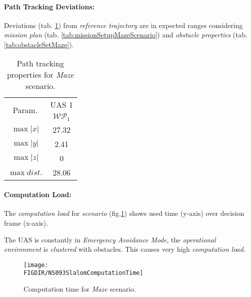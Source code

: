 \paragraph{Path Tracking Deviations:} Deviations (tab. \ref{tab:pathTrackingParametersForMazeAvoidance}) from \emph{reference trajectory} are in expected ranges considering \emph{mission plan} (tab. \ref{tab:missionSetupMazeScenario}) and \emph{obstacle properties} (tab. \ref{tab:obstacleSetMaze}).

\begin{table}[H]
    \centering
    \begin{tabular}{c||c}
        \multirow{2}{*}{Param.} & UAS 1\\\cline{2-2}
                        & $\mathscr{WP}_1$  \\\hline\hline
          $\max |x|$    & 27.32             \\\hline
          $\max |y|$    & 2.41             \\\hline
          $\max |z|$    & 0                 \\\hline
          $\max dist.$  & 28.06             \\
    \end{tabular}
    \caption{Path tracking properties for \emph{Maze} scenario.}
    \label{tab:pathTrackingParametersForMazeAvoidance}
\end{table}


\paragraph{Computation Load:} The \emph{computation load} for \emph{scenario} (fig.\ref{fig:mazeComputationTime}) shows used time (y-axis) over decision frame (x-axis).

The UAS is constantly in \emph{Emergency Avoidance Mode}, the \emph{operational environment} is \emph{clustered} with obstacles. This causes very high \emph{computation load}.

\begin{figure}[H]
    \centering
    \texttt{[image: \\FIGDIR/NS093SlalomComputationTime]} 
    \caption{Computation time for \emph{Maze} scenario.}
    \label{fig:mazeComputationTime}
\end{figure}


